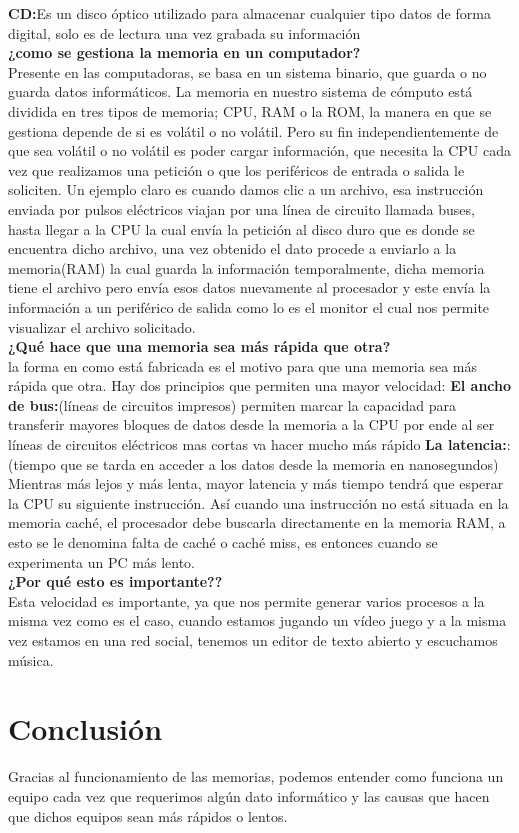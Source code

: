 \documentclass{article}
\begin{document}
\textbf{CD:}Es un disco óptico utilizado para almacenar cualquier tipo datos de forma digital, solo es de lectura una vez grabada su información
\\[2ex]
\textbf{¿como se gestiona la memoria en un computador?}
\\[2ex]
Presente en las computadoras, se basa en un sistema binario, que guarda o no guarda datos informáticos. La memoria en nuestro sistema de cómputo está dividida en tres tipos de memoria; CPU, RAM o la ROM, la manera en que se gestiona depende de si es volátil o no volátil. Pero su fin independientemente de que sea volátil o no volátil es poder cargar información, que necesita la CPU cada vez que realizamos una petición o que los periféricos de entrada o salida le soliciten. Un ejemplo claro es cuando damos clic a un archivo, esa instrucción enviada por pulsos eléctricos viajan por una línea de circuito llamada buses, hasta llegar a la CPU la cual envía la petición al disco duro que es donde se encuentra dicho archivo, una vez obtenido el dato procede a enviarlo a la memoria(RAM) la cual guarda la información temporalmente, dicha memoria tiene el archivo pero envía esos datos nuevamente al procesador y este envía la información a un periférico de salida como lo es el monitor el cual nos permite visualizar el archivo solicitado.
\\[2ex]
\textbf{¿Qué hace que una memoria sea más rápida que otra?}
\\[2ex]
la forma en como está fabricada es el motivo para que una memoria sea más rápida que otra. Hay dos principios que permiten una mayor velocidad:
\textbf{El ancho de bus:}(líneas de circuitos impresos) permiten marcar la capacidad para transferir mayores bloques de datos desde la memoria a la CPU por ende al ser líneas de circuitos eléctricos mas cortas va hacer mucho más rápido
\textbf{La latencia:}:(tiempo que se tarda en acceder a los datos desde la memoria en nanosegundos) Mientras más lejos y más lenta, mayor latencia y más tiempo tendrá que esperar la CPU su siguiente instrucción. Así cuando una instrucción no está situada en la memoria caché, el procesador debe buscarla directamente en la memoria RAM, a esto se le denomina falta de caché o caché miss, es entonces cuando se experimenta un PC más lento.
\\[2ex]
\textbf{¿Por qué esto es importante??}
\\[2ex]
Esta velocidad es importante, ya que nos permite generar varios procesos a la misma vez como es el caso, cuando estamos jugando un vídeo juego y a la misma vez estamos en una red social, tenemos un editor de texto abierto y escuchamos música. 



\section{Conclusión} \label{conclulsion}

Gracias al funcionamiento de las memorias, podemos entender como funciona un equipo cada vez que requerimos algún dato informático y las causas que hacen que dichos equipos sean más rápidos o lentos.

\cite{patterson2000estructura}


\end{document}
